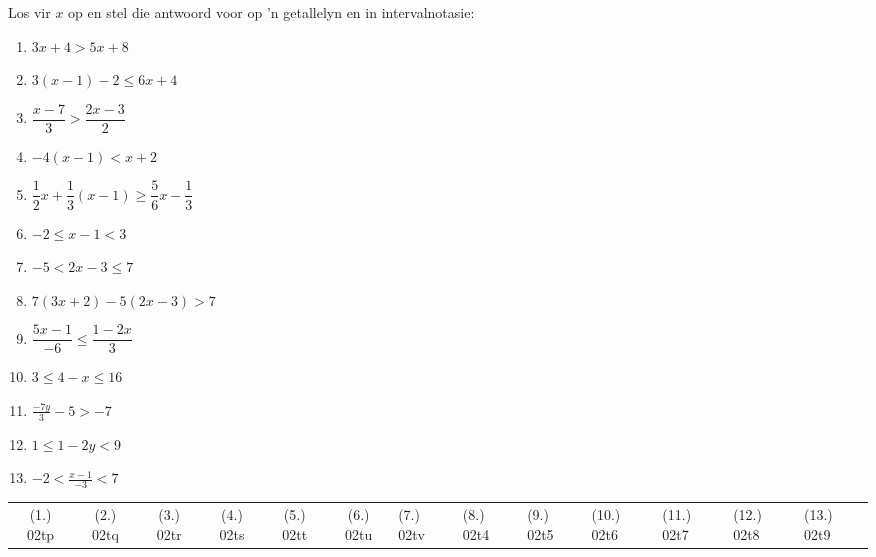 \begin{exercises}{ }
{
Los vir $x$ op en stel die antwoord voor op 'n getallelyn en in intervalnotasie:
\begin{enumerate}[itemsep=6pt, label=\textbf{\arabic*}. ] 
    \item $3x+4>5x+8$
    \item $3(x-1)-2\leq 6x+4$ 
    \item $\dfrac{x-7}{3}>\dfrac{2x-3}{2}$
    \item $-4(x-1)<x+2$
    \item $\dfrac{1}{2}x+\dfrac{1}{3}(x-1)\geq \dfrac{5}{6}x-\dfrac{1}{3}$ 
    \item $-2\leq x-1<3$ 
    \item $-5<2x-3\leq7$ 
\item $7(3x+2)-5(2x-3)>7$
\item $\dfrac{5x - 1}{-6} \leq \dfrac{1-2x}{3}$
\item $3 \leq 4 - x \leq 16$
\item $\frac{-7y}{3} - 5 > -7$
\item $1 \leq 1 - 2y < 9$
\item $-2 < \frac{x-1}{-3}<7$
    \end{enumerate}

\practiceinfo

\par \begin{tabular}[h]{cccccc}
(1.) 02tp &  (2.) 02tq &  (3.) 02tr & (4.) 02ts & (5.) 02tt & (6.) 02tu & (7.) 02tv & (8.) 02t4 & (9.) 02t5 & (10.) 02t6
& (11.) 02t7 & (12.) 02t8 & (13.) 02t9 &\end{tabular}
}
\end{exercises}



